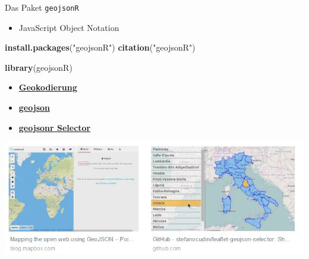 \documentclass[ignorenonframetext,]{beamer}
\newenvironment{Shaded}{\begin{snugshade}}{\end{snugshade}}
\newcommand{\KeywordTok}[1]{\textcolor[rgb]{0.26,0.66,0.93}{\textbf{#1}}}
\newcommand{\NormalTok}[1]{\textcolor[rgb]{0.74,0.68,0.62}{#1}}
\newcommand{\StringTok}[1]{\textcolor[rgb]{0.02,0.61,0.04}{#1}}
\providecommand{\tightlist}{%
  \setlength{\itemsep}{0pt}\setlength{\parskip}{0pt}}
\begin{document}
\begin{frame}[fragile]{Das Paket \texttt{geojsonR}}
\protect\hypertarget{das-paket-geojsonr}{}

\begin{itemize}
\tightlist
\item
  JavaScript Object Notation
\end{itemize}

\begin{Shaded}
\begin{Highlighting}[]
\KeywordTok{install.packages}\NormalTok{(}\StringTok{"geojsonR"}\NormalTok{)}
\KeywordTok{citation}\NormalTok{(}\StringTok{"geojsonR"}\NormalTok{)}
\end{Highlighting}
\end{Shaded}

\begin{Shaded}
\begin{Highlighting}[]
\KeywordTok{library}\NormalTok{(geojsonR)}
\end{Highlighting}
\end{Shaded}

\begin{itemize}
\tightlist
\item
  \href{https://github.com/mlampros/shiny-server}{\textbf{Geokodierung}}
\end{itemize}

\begin{itemize}
\tightlist
\item
  \href{https://lampros.shinyapps.io/shiny_geojson/}{\textbf{geojson}}
\item
  \href{http://labs.easyblog.it/maps/leaflet-geojson-selector/}{\textbf{geojsonr
  Selector}}
\end{itemize}

\includegraphics{figure/geojsonr.PNG}

\end{frame}
\end{document}
